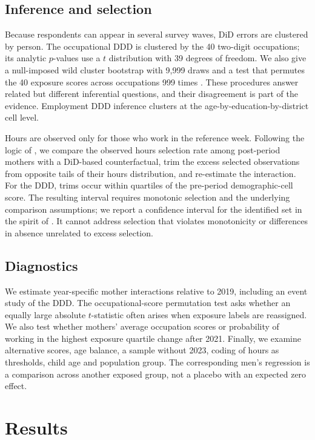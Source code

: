 \documentclass[12pt,a4paper]{article}
\begin{document}
\subsection{Inference and selection}\label{sec:inference}
Because respondents can appear in several survey waves, DiD errors are clustered by person. The occupational DDD is clustered by the 40 two-digit occupations; its analytic $p$-values use a $t$ distribution with 39 degrees of freedom. We also give a null-imposed wild cluster bootstrap with 9,999 draws \citep{roodman2019,fischer2021} and a test that permutes the 40 exposure scores across occupations 999 times \citep{phipson2010}. These procedures answer related but different inferential questions, and their disagreement is part of the evidence. Employment DDD inference clusters at the age-by-education-by-district cell level.

Hours are observed only for those who work in the reference week. Following the logic of \citet{lee2009}, we compare the observed hours selection rate among post-period mothers with a DiD-based counterfactual, trim the excess selected observations from opposite tails of their hours distribution, and re-estimate the interaction. For the DDD, trims occur within quartiles of the pre-period demographic-cell score. The resulting interval requires monotonic selection and the underlying comparison assumptions; we report a confidence interval for the identified set in the spirit of \citet{imbens2004}. It cannot address selection that violates monotonicity or differences in absence unrelated to excess selection.

\subsection{Diagnostics}
We estimate year-specific mother interactions relative to 2019, including an event study of the DDD. The occupational-score permutation test asks whether an equally large absolute $t$-statistic often arises when exposure labels are reassigned. We also test whether mothers' average occupation scores or probability of working in the highest exposure quartile change after 2021. Finally, we examine alternative scores, age balance, a sample without 2023, coding of hours as thresholds, child age and population group. The corresponding men's regression is a comparison across another exposed group, not a placebo with an expected zero effect.

\section{Results}\label{sec:results}
\end{document}
